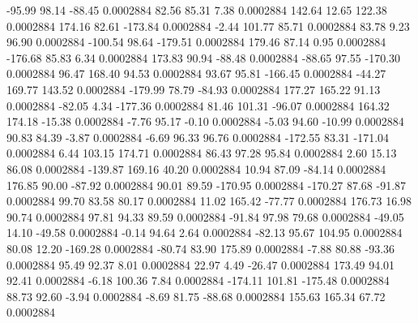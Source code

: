       -95.99       98.14      -88.45     0.0002884
       82.56       85.31        7.38     0.0002884
      142.64       12.65      122.38     0.0002884
      174.16       82.61     -173.84     0.0002884
       -2.44      101.77       85.71     0.0002884
       83.78        9.23       96.90     0.0002884
     -100.54       98.64     -179.51     0.0002884
      179.46       87.14        0.95     0.0002884
     -176.68       85.83        6.34     0.0002884
      173.83       90.94      -88.48     0.0002884
      -88.65       97.55     -170.30     0.0002884
       96.47      168.40       94.53     0.0002884
       93.67       95.81     -166.45     0.0002884
      -44.27      169.77      143.52     0.0002884
     -179.99       78.79      -84.93     0.0002884
      177.27      165.22       91.13     0.0002884
      -82.05        4.34     -177.36     0.0002884
       81.46      101.31      -96.07     0.0002884
      164.32      174.18      -15.38     0.0002884
       -7.76       95.17       -0.10     0.0002884
       -5.03       94.60      -10.99     0.0002884
       90.83       84.39       -3.87     0.0002884
       -6.69       96.33       96.76     0.0002884
     -172.55       83.31     -171.04     0.0002884
        6.44      103.15      174.71     0.0002884
       86.43       97.28       95.84     0.0002884
        2.60       15.13       86.08     0.0002884
     -139.87      169.16       40.20     0.0002884
       10.94       87.09      -84.14     0.0002884
      176.85       90.00      -87.92     0.0002884
       90.01       89.59     -170.95     0.0002884
     -170.27       87.68      -91.87     0.0002884
       99.70       83.58       80.17     0.0002884
       11.02      165.42      -77.77     0.0002884
      176.73       16.98       90.74     0.0002884
       97.81       94.33       89.59     0.0002884
      -91.84       97.98       79.68     0.0002884
      -49.05       14.10      -49.58     0.0002884
       -0.14       94.64        2.64     0.0002884
      -82.13       95.67      104.95     0.0002884
       80.08       12.20     -169.28     0.0002884
      -80.74       83.90      175.89     0.0002884
       -7.88       80.88      -93.36     0.0002884
       95.49       92.37        8.01     0.0002884
       22.97        4.49      -26.47     0.0002884
      173.49       94.01       92.41     0.0002884
       -6.18      100.36        7.84     0.0002884
     -174.11      101.81     -175.48     0.0002884
       88.73       92.60       -3.94     0.0002884
       -8.69       81.75      -88.68     0.0002884
      155.63      165.34       67.72     0.0002884
